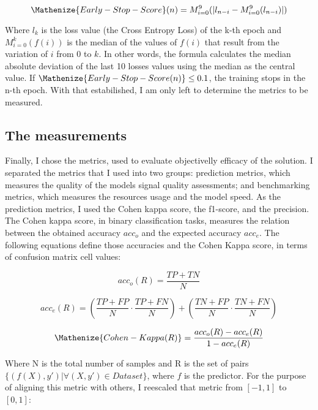 \begin{equation}
\Mathenize{Early-Stop-Score}(n) = M_{i=0}^{9}(|l_{n-i} - M_{i=0}^{9}(l_{n-i})|)
\end{equation}

\noindent Where $l_k$ is the loss value (the Cross Entropy Loss) of the k-th epoch and $M_{i=0}^k(f(i))$ is the median of the values of $f(i)$ that result from the variation of $i$ from $0$ to $k$. In other words, the formula calculates the median absolute deviation of the last 10 losses values using the median as the central value. If $\Mathenize{Early-Stop-Score(n)} \leq 0.1$, the training stops in the n-th epoch. With that estabilished, I am only left to determine the metrics to be measured.     

\subsection{The measurements}

Finally, I chose the metrics, used to evaluate objectivelly efficacy of the solution. I separated the metrics that I used into two groups: prediction metrics, which measures the quality of the models signal quality assessments; and benchmarking metrics, which measures the resources usage and the model speed. As the prediction metrics, I used the Cohen kappa score, the f1-score, and the precision. The Cohen kappa score, in binary classification tasks, measures the relation between the obtained accuracy $acc_o$ and the expected accuracy $acc_e$. The following equations define those accuracies and the Cohen Kappa score, in terms of confusion matrix cell values:

\begin{equation} 
acc_o(R) = \frac{TP+TN}{N}
\end{equation}

\begin{equation}
acc_e(R)  = \left(\frac{TP+FP}{N} \cdot \frac{TP+FN}{N}\right) + \left(\frac{TN+FP}{N} \cdot \frac{TN+FN}{N}\right)
\end{equation}

\begin{equation} \label{eq:Cohen Kappa}
\Mathenize{Cohen-Kappa(R)}  = \frac{acc_o(R) - acc_e(R)}{1 - acc_e(R)} 
\end{equation}  

\noindent Where N is the total number of samples and R is the set of pairs $\{(f(X),y') | \forall (X,y') \in Dataset\}$, where $f$ is the predictor. For the purpose of aligning this metric with others, I reescaled that metric from $[-1,1]$ to $[0,1]$:

